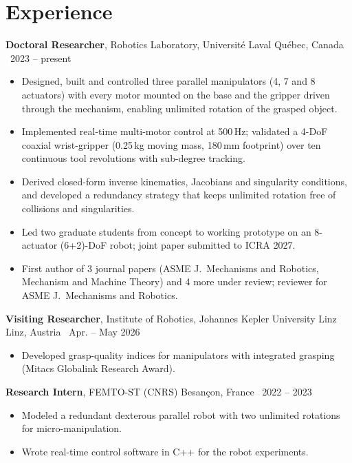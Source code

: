 \documentclass[10pt,letterpaper]{article}
\newcommand{\role}[4]{\textbf{#1}, #2 \hfill {\color{muted}#3 \textbar\ #4}\par}
\begin{document}
\section{Experience}
\role{Doctoral Researcher}{Robotics Laboratory, Universit\'e Laval}{Qu\'ebec, Canada}{2023 -- present}
\begin{itemize}
\item Designed, built and controlled three parallel manipulators (4, 7 and 8 actuators) with every motor
mounted on the base and the gripper driven through the mechanism, enabling unlimited rotation of the grasped object.
\item Implemented real-time multi-motor control at 500\,Hz; validated a 4-DoF coaxial wrist-gripper (0.25\,kg moving mass,
180\,mm footprint) over ten continuous tool revolutions with sub-degree tracking.
\item Derived closed-form inverse kinematics, Jacobians and singularity conditions, and developed a redundancy
strategy that keeps unlimited rotation free of collisions and singularities.
\item Led two graduate students from concept to working prototype on an 8-actuator (6+2)-DoF robot; joint paper
submitted to ICRA 2027.
\item First author of 3 journal papers (ASME J.\ Mechanisms and Robotics, Mechanism and Machine Theory) and 4 more
under review; reviewer for ASME J.\ Mechanisms and Robotics.
\end{itemize}

\vspace{3pt}
\role{Visiting Researcher}{Institute of Robotics, Johannes Kepler University Linz}{Linz, Austria}{Apr. -- May 2026}
\begin{itemize}
\item Developed grasp-quality indices for manipulators with integrated grasping (Mitacs Globalink Research Award).
\end{itemize}

\vspace{3pt}
\role{Research Intern}{FEMTO-ST (CNRS)}{Besan\c{c}on, France}{2022 -- 2023}
\begin{itemize}
\item Modeled a redundant dexterous parallel robot with two unlimited rotations for micro-manipulation.
\item Wrote real-time control software in C++ for the robot experiments.
\end{itemize}
\end{document}
